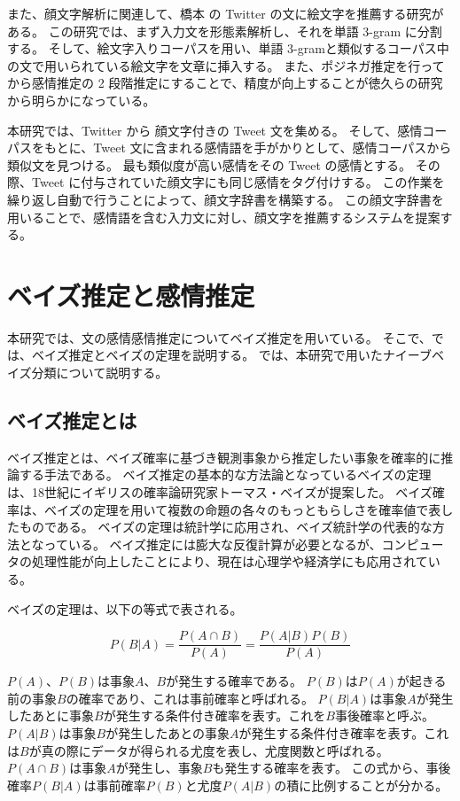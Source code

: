 \documentclass[11pt,a4j]{jsarticle}
\begin{document}
また、顔文字解析に関連して、橋本  の Twitter の文に絵文字を推薦する研究がある。
この研究では、まず入力文を形態素解析し、それを単語 3-gram に分割する。
そして、絵文字入りコーパスを用い、単語 3-gramと類似するコーパス中の文で用いられている絵文字を文章に挿入する。
また、ポジネガ推定を行ってから感情推定の 2 段階推定にすることで、精度が向上することが徳久らの研究 から明らかになっている。

本研究では、Twitter から 顔文字付きの Tweet 文を集める。
そして、感情コーパスをもとに、Tweet 文に含まれる感情語を手がかりとして、感情コーパスから類似文を見つける。
最も類似度が高い感情をその Tweet の感情とする。
その際、Tweet に付与されていた顔文字にも同じ感情をタグ付けする。
この作業を繰り返し自動で行うことによって、顔文字辞書を構築する。
この顔文字辞書を用いることで、感情語を含む入力文に対し、顔文字を推薦するシステムを提案する。

\section{ベイズ推定と感情推定}\label{sec:def}
本研究では、文の感情感情推定についてベイズ推定を用いている。
そこで、では、ベイズ推定とベイズの定理を説明する。
では、本研究で用いたナイーブベイズ分類について説明する。

  \subsection{ベイズ推定とは}\label{sec:defbayes}
ベイズ推定とは、ベイズ確率に基づき観測事象から推定したい事象を確率的に推論する手法である。
ベイズ推定の基本的な方法論となっているベイズの定理は、18世紀にイギリスの確率論研究家トーマス・ベイズが提案した。
ベイズ確率は、ベイズの定理を用いて複数の命題の各々のもっともらしさを確率値で表したものである。
ベイズの定理は統計学に応用され、ベイズ統計学の代表的な方法となっている。
ベイズ推定には膨大な反復計算が必要となるが、コンピュータの処理性能が向上したことにより、現在は心理学や経済学にも応用されている。

ベイズの定理は、以下の等式で表される。

\[
P(B|A)=\frac{P(A \cap B)}{P(A)}=\frac{P(A|B)P(B)}{P(A)}
\]


$P(A)$、$P(B)$は事象$A$、$B$が発生する確率である。
$P(B)$は$P(A)$が起きる前の事象$B$の確率であり、これは事前確率と呼ばれる。
$P(B|A)$は事象$A$が発生したあとに事象$B$が発生する条件付き確率を表す。これを$B$事後確率と呼ぶ。
$P(A|B)$は事象$B$が発生したあとの事象$A$が発生する条件付き確率を表す。これは$B$が真の際にデータが得られる尤度を表し、尤度関数と呼ばれる。
$P(A \cap B)$は事象$A$が発生し、事象$B$も発生する確率を表す。
この式から、事後確率$P(B|A)$は事前確率$P(B)$と尤度$P(A|B)$の積に比例することが分かる。
\end{document}
